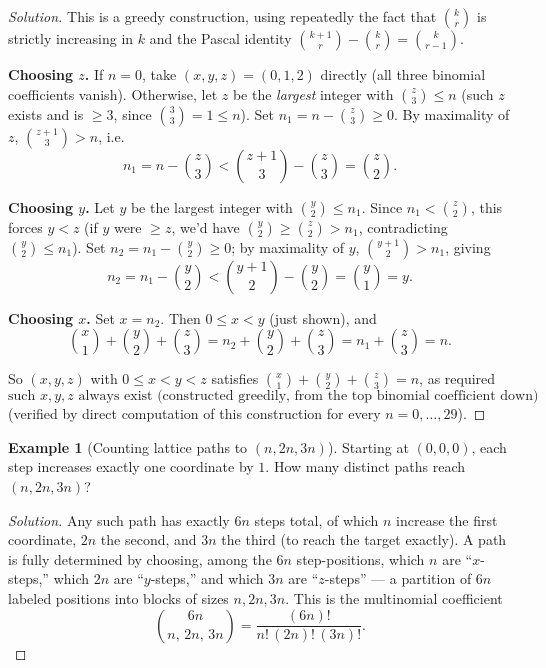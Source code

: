 \documentclass[11pt]{article}
\theoremstyle{definition}
\newtheorem{example}{Example}[section]
\begin{document}
\begin{proof}[Solution]
This is a greedy construction, using repeatedly the fact that $\binom{k}{r}$ is strictly increasing in $k$ and the Pascal identity $\binom{k+1}{r}-\binom kr=\binom k{r-1}$.

\textbf{Choosing $z$.} If $n=0$, take $(x,y,z)=(0,1,2)$ directly (all three binomial coefficients vanish). Otherwise, let $z$ be the \emph{largest} integer with $\binom z3\le n$ (such $z$ exists and is $\ge3$, since $\binom33=1\le n$). Set $n_1=n-\binom z3\ge0$. By maximality of $z$, $\binom{z+1}3>n$, i.e.\
\[
n_1=n-\binom z3<\binom{z+1}3-\binom z3=\binom z2.
\]

\textbf{Choosing $y$.} Let $y$ be the largest integer with $\binom y2\le n_1$. Since $n_1<\binom z2$, this forces $y<z$ (if $y$ were $\ge z$, we'd have $\binom y2\ge\binom z2>n_1$, contradicting $\binom y2\le n_1$). Set $n_2=n_1-\binom y2\ge0$; by maximality of $y$, $\binom{y+1}2>n_1$, giving
\[
n_2=n_1-\binom y2<\binom{y+1}2-\binom y2=\binom y1=y.
\]

\textbf{Choosing $x$.} Set $x=n_2$. Then $0\le x<y$ (just shown), and
\[
\binom x1+\binom y2+\binom z3=n_2+\binom y2+\binom z3=n_1+\binom z3=n.
\]

So $(x,y,z)$ with $0\le x<y<z$ satisfies $\binom x1+\binom y2+\binom z3=n$, as required
\[
\boxed{\text{such } x,y,z \text{ always exist (constructed greedily, from the top binomial coefficient down)}}
\]
(verified by direct computation of this construction for every $n=0,\dots,29$).
\end{proof}

\begin{example}[Counting lattice paths to $(n,2n,3n)$]
Starting at $(0,0,0)$, each step increases exactly one coordinate by $1$. How many distinct paths reach $(n,2n,3n)$?
\end{example}
\begin{proof}[Solution]
Any such path has exactly $6n$ steps total, of which $n$ increase the first coordinate, $2n$ the second, and $3n$ the third (to reach the target exactly). A path is fully determined by choosing, among the $6n$ step-positions, which $n$ are ``$x$-steps,'' which $2n$ are ``$y$-steps,'' and which $3n$ are ``$z$-steps'' — a partition of $6n$ labeled positions into blocks of sizes $n,2n,3n$. This is the multinomial coefficient
\[
\boxed{\binom{6n}{n,\,2n,\,3n}=\frac{(6n)!}{n!\,(2n)!\,(3n)!}}.
\]
\end{proof}
\end{document}
